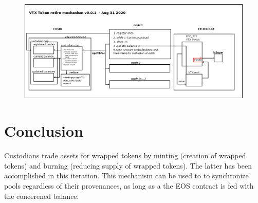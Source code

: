 \documentclass[]{article}
\begin{document}
 
 
\begin{figure}
\centering
	\includegraphics[scale=.33333]{bridge.png}
\caption{}
\label{fig:whitebackground-ecosystem02}
\end{figure}


\section{Conclusion}
Custodians trade assets for wrapped tokens by minting (creation of wrapped tokens) and burning (reducing supply of wrapped tokens). The latter has been accomplished in this iteration.
This mechanism can be used to to synchronize pools regardless of their provenances, as long as a the EOS contract is fed with the concerened balance.
\end{document}
